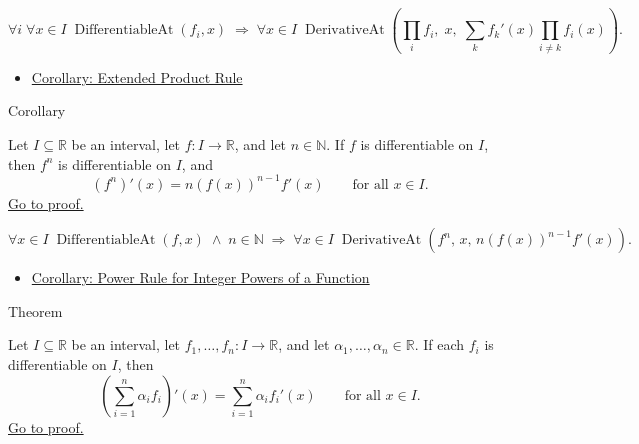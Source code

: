\begin{remark*}
\[
\forall i\;\forall x\in I\;\operatorname{DifferentiableAt}(f_i,x)
\;\Rightarrow\;
\forall x\in I\;\operatorname{DerivativeAt}\!\left(\textstyle\prod_i f_i,\;x,\;\textstyle\sum_k f_k'(x)\prod_{i\neq k} f_i(x)\right).
\]
\end{remark*}

\begin{dependencies}
\begin{itemize}
  \item \hyperref[cor:extended-product-rule]{Corollary: Extended Product Rule}
\end{itemize}
\end{dependencies}


\begin{corollarybox}{Corollary}
\begin{corollary}
\label{cor:power-rule-special-case-interval}
Let $I \subseteq \mathbb{R}$ be an interval, let $f : I \to \mathbb{R}$, and let $n \in \mathbb{N}$. If $f$ is differentiable on $I$, then $f^n$ is differentiable on $I$, and
\[
(f^n)'(x) = n(f(x))^{n-1}f'(x) \qquad \text{for all } x \in I.
\]
\hyperref[prf:power-rule-special-case-interval]{Go to proof.}
\end{corollary}
\end{corollarybox}

\begin{remark*}
\[
\forall x\in I\;\operatorname{DifferentiableAt}(f,x) \;\land\; n\in\mathbb{N}
\;\Rightarrow\;
\forall x\in I\;\operatorname{DerivativeAt}(f^n,\,x,\,n(f(x))^{n-1}f'(x)).
\]
\end{remark*}

\begin{dependencies}
\begin{itemize}
  \item \hyperref[cor:power-rule-special-case]{Corollary: Power Rule for Integer Powers of a Function}
\end{itemize}
\end{dependencies}


\begin{theorembox}{Theorem}
\begin{theorem}
\label{thm:finite-linear-combination-rule-interval}
Let $I \subseteq \mathbb{R}$ be an interval, let $f_1, \dots, f_n : I \to \mathbb{R}$, and let $\alpha_1, \dots, \alpha_n \in \mathbb{R}$. If each $f_i$ is differentiable on $I$, then
\[
\left(\sum_{i=1}^{n} \alpha_i f_i\right)'(x) = \sum_{i=1}^{n} \alpha_i f_i'(x) \qquad \text{for all } x \in I.
\]
\hyperref[prf:finite-linear-combination-rule-interval]{Go to proof.}
\end{theorem}
\end{theorembox}

